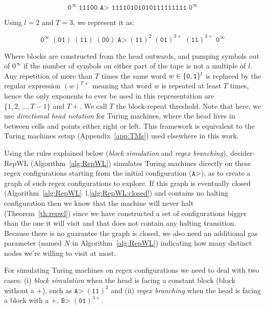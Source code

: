 $$ \texttt{0}^\infty \; \texttt{11100 A> 11110101010111111111} \; \texttt{0}^\infty$$

Using $l=2$ and $T = 3$, we represent it as:

$$ \texttt{0}^\infty \; (\texttt{01}) \; (\texttt{11}) \; (\texttt{00}) \; \texttt{A>} \; (\texttt{11})^2 \; (\texttt{01})^{3+} \; (\texttt{11})^{3+} \; \texttt{0}^\infty $$

Where blocks are constructed from the head outwards, and pumping symbols \szero out of $0^\infty$ if the number of symbols on either part of the tape is not a multiple of $l$. Any repetition of more than $T$ times the same word $w \in \{\texttt{0},\texttt{1}\}^l$ is replaced by the regular expression $(w)^{T+}$ meaning that word $w$ is repeated at least $T$ times, hence the only exponents to ever be used in this representation are $\{1,2,\dots,T-1\}$ and $T+$. We call $T$ the block-repeat threshold. Note that here, we use \textit{directional head notation} for Turing machines, where the head lives in between cells and points either right or left. This framework is equivalent to the Turing machines setup (Appendix~\ref{app:TMs}) used elsewhere in this work.

Using the rules explained below (\textit{block simulation} and \textit{regex branching}), {\sc decider-RepWL} (Algorithm~\ref{alg:RepWL}) simulates Turing machines directly on these regex configurations starting from the initial configuration (\ie $\texttt{A>}$), as to create a graph of such regex configurations to explore. If this graph is eventually closed (Algorithm~\ref{alg:RepWL}~l.\ref{alg:RepWL:closed}) and contains no halting configuration then we know that the machine will never halt (Theorem~\ref{th:repwl}) since we have constructed a set of configurations bigger than the one it will visit and that does not contain any halting transition. Because there is no guarantee the graph is closed, we also need an additional gas parameter (named $N$ in Algorithm~\ref{alg:RepWL}) indicating how many distinct nodes we're willing to visit at most.

For simulating Turing machines on regex configurations we need to deal with two cases: (i) \textit{block simulation} when the head is facing a constant block (\ie block without a $+$), such as $\texttt{A>} \; (\texttt{11})^2$ and (ii) \textit{regex branching} when the head is facing a block with a $+$, \eg $\texttt{B>} \; (\texttt{01})^{3+}$.

